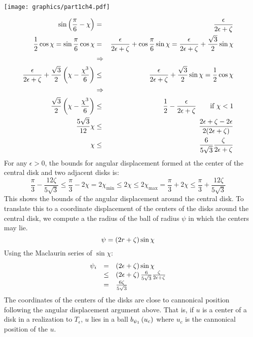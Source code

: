 \begin{minipage}{\linewidth}
\begin{center}
\texttt{[image: graphics/part1ch4.pdf]}
\label{fig:part1ch4.pdf}
\end{center}
\end{minipage}

\begin{eqnarray*}
\sin \left( \frac{\pi}{6} - \chi \right) &=& \frac{\epsilon}{2\epsilon+\zeta}\\
\frac{1}{2}\cos \chi = \sin \frac{\pi}{6} \cos \chi &=& \frac{\epsilon}{2\epsilon+\zeta} + \cos \frac{\pi}{6} \sin \chi = \frac{\epsilon}{2\epsilon+\zeta} +\frac{\sqrt{3}}{2} \sin \chi \\
&\Rightarrow&\\
\frac{\epsilon}{2\epsilon+\zeta} + \frac{\sqrt{3}}{2} \left(  \chi - \frac{\chi^3}{6} \right) &\leq& \frac{\epsilon}{2\epsilon+\zeta} + \frac{\sqrt{3}}{2} \sin \chi =\frac{1}{2} \cos \chi\\
&\Rightarrow&\\
\frac{\sqrt{3}}{2} \left(  \chi - \frac{\chi^3}{6} \right)&\leq& \frac{1}{2}-\frac{\epsilon}{2\epsilon+\zeta}  \qquad \text{if }\chi < 1 \\
\frac{5\sqrt{3}}{12} \chi &\leq&\frac{2\epsilon + \zeta - 2\epsilon}{2 ( 2\epsilon + \zeta)} \\
\chi &\leq& \frac{6}{5 \sqrt{3}}\frac{\zeta}{ 2\epsilon + \zeta} 
\end{eqnarray*}
For any $\epsilon > 0$, the bounds for angular displacement formed at the center of the central disk and two adjacent disks is:
$$ \frac{\pi}{3} - \frac{12 \zeta}{5\sqrt{3}} \leq \frac{\pi}{3} - 2 \chi = 2\chi_\text{min} \leq 2\chi \leq 2\chi_\text{max} = \frac{\pi}{3} + 2 \chi \leq \frac{\pi}{3} + \frac{12 \zeta}{5\sqrt{3}}$$
This shows the bounds of the angular displacement around the central disk.  
To translate this to a coordinate displacement of the centers of the disks around the central disk, we compute a the radius of the ball of radius $\psi$ in which the centers may lie. 
$$\psi = \left( 2 r + \zeta \right) \sin \chi$$
Using the Maclaurin series of $\sin \chi$:
$$
\begin{array}{rcl}
\psi_i &=& \left( 2 \epsilon + \zeta \right) \sin \chi\\
&\leq& \left( 2 \epsilon + \zeta \right) \frac{6}{5 \sqrt{3}}\frac{\zeta}{ 2\epsilon+ \zeta} \\
&=& \frac{6\zeta}{5 \sqrt{3}}
\end{array}
$$
The coordinates of the centers of the disks are close to cannonical position following the angular displacement argument above.  
That is, if $u$ is a center of a disk in a realization to $T_\epsilon$, $u$ lies in a ball $b_{\psi_1}\left( u_c \right)$ where $u_c$ is the cannonical position of the $u$.  

